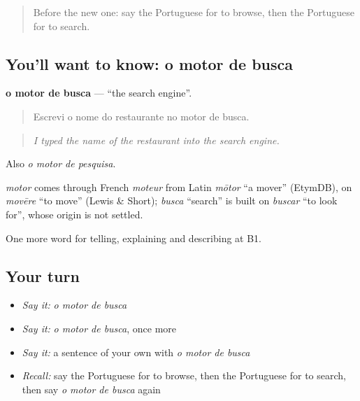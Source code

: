 \begin{quote}
Before the new one: say the Portuguese for to browse, then the Portuguese for to search.
\end{quote}

\subsection*{You'll want to know: o motor de busca}
\textbf{o motor de busca} — \textquotedblleft{}the search engine\textquotedblright{}.

\begin{quote}
Escrevi o nome do restaurante no motor de busca.
\end{quote}

\begin{quote}
\emph{I typed the name of the restaurant into the search engine.}
\end{quote}

Also \emph{o motor de pesquisa}.

\begin{cousinweb}
\emph{motor} comes through French \emph{moteur} from Latin \emph{mōtor} \textquotedblleft{}a mover\textquotedblright{} (EtymDB), on \emph{movēre} \textquotedblleft{}to move\textquotedblright{} (Lewis \& Short); \emph{busca} \textquotedblleft{}search\textquotedblright{} is built on \emph{buscar} \textquotedblleft{}to look for\textquotedblright{}, whose origin is not settled.
\end{cousinweb}

\begin{grammarlens}[title={What you've built}]
One more word for telling, explaining and describing at B1.
\end{grammarlens}

\subsection*{Your turn}
\begin{itemize}
\raggedright
  \item \emph{Say it:} \emph{o motor de busca}
  \item \emph{Say it:} \emph{o motor de busca}, once more
  \item \emph{Say it:} a sentence of your own with \emph{o motor de busca}
  \item \emph{Recall:} say the Portuguese for to browse, then the Portuguese for to search, then say \emph{o motor de busca} again
\end{itemize}

